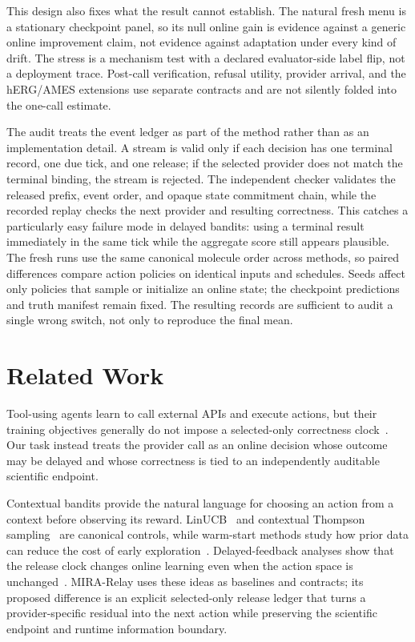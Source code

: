 \documentclass[sigconf,anonymous]{aamas}
\begin{document}
This design also fixes what the result cannot establish. The natural fresh menu is a stationary checkpoint panel, so its null online gain is evidence against a generic online improvement claim, not evidence against adaptation under every kind of drift. The stress is a mechanism test with a declared evaluator-side label flip, not a deployment trace. Post-call verification, refusal utility, provider arrival, and the hERG/AMES extensions use separate contracts and are not silently folded into the one-call estimate.

The audit treats the event ledger as part of the method rather than as an implementation detail. A stream is valid only if each decision has one terminal record, one due tick, and one release; if the selected provider does not match the terminal binding, the stream is rejected. The independent checker validates the released prefix, event order, and opaque state commitment chain, while the recorded replay checks the next provider and resulting correctness. This catches a particularly easy failure mode in delayed bandits: using a terminal result immediately in the same tick while the aggregate score still appears plausible. The fresh runs use the same canonical molecule order across methods, so paired differences compare action policies on identical inputs and schedules. Seeds affect only policies that sample or initialize an online state; the checkpoint predictions and truth manifest remain fixed. The resulting records are sufficient to audit a single wrong switch, not only to reproduce the final mean.

\section{Related Work}
Tool-using agents learn to call external APIs and execute actions, but their training objectives generally do not impose a selected-only correctness clock~\cite{schick2023toolformer,yao2023react}. Our task instead treats the provider call as an online decision whose outcome may be delayed and whose correctness is tied to an independently auditable scientific endpoint.

Contextual bandits provide the natural language for choosing an action from a context before observing its reward. LinUCB~\cite{li2010contextual} and contextual Thompson sampling~\cite{agrawal2013thompson} are canonical controls, while warm-start methods study how prior data can reduce the cost of early exploration~\cite{oetomo2023warmstart}. Delayed-feedback analyses show that the release clock changes online learning even when the action space is unchanged~\cite{joulani2013online}. MIRA-Relay uses these ideas as baselines and contracts; its proposed difference is an explicit selected-only release ledger that turns a provider-specific residual into the next action while preserving the scientific endpoint and runtime information boundary.
\end{document}
